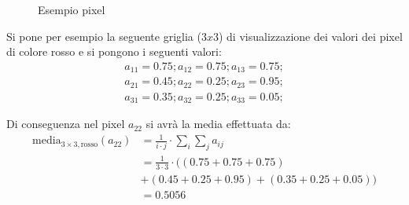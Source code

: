 \begin{figure}[H]
        \centering
        \caption{Esempio pixel}
        \label{fig:pixel}
\end{figure}
Si pone per esempio la seguente griglia ($3x3$) di visualizzazione 
dei valori dei pixel di colore rosso e si pongono i seguenti valori:
\begin{align}
    a_{11}=0.75;a_{12}=0.75;a_{13}=0.75;\\
    a_{21}=0.45;a_{22}=0.25;a_{23}=0.95;\\
    a_{31}=0.35;a_{32}=0.25;a_{33}=0.05;
\end{align}

Di conseguenza nel pixel $a_{22}$ si avrà la media effettuata da:
\begin{align}
    \mathrm{media}_{3\times3,\mathrm{rosso}}(a_{22})&=\frac{1}{i\cdot j}\cdot\sum_i\sum_j a_{ij}\\
    &=\frac{1}{3\cdot3}\cdot \big( \left( 0.75+0.75+0.75\right)\\
    &+ \left( 0.45+0.25+0.95\right)+ \left(0.35+0.25+0.05\right)\big)\\
    &=0.5056
\end{align} 

